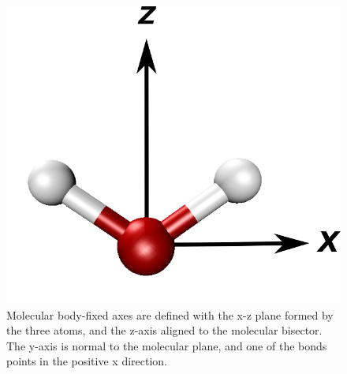 \documentclass{article}
\begin{document}

\begin{figure}[h!]
	\begin{center}
		\includegraphics[scale=1.0]{molecularframesmall.png}
		\caption{Molecular body-fixed axes are defined with the x-z plane formed by the three atoms, and the z-axis aligned to the molecular bisector. The y-axis is normal to the molecular plane, and one of the bonds points in the positive x direction.}
		\label{fig:molecular-frame}
	\end{center}
\end{figure}
\end{document}
